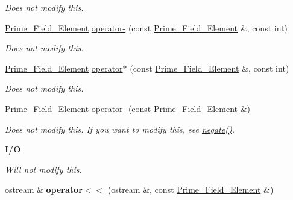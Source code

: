 \begin{Indent}
\begin{DoxyCompactItemize}
\begin{DoxyCompactList}\small\item\em Does not modify {\ttfamily this}. \end{DoxyCompactList}\item 
\mbox{\label{group___fields_group_accac0f77357d7389ac1fc8613be39d72}} 
\hyperlink{group___fields_group_class_prime___field___element}{Prime\+\_\+\+Field\+\_\+\+Element} \hyperlink{group___fields_group_accac0f77357d7389ac1fc8613be39d72}{operator-\/} (const \hyperlink{group___fields_group_class_prime___field___element}{Prime\+\_\+\+Field\+\_\+\+Element} \&, const int)
\begin{DoxyCompactList}\small\item\em Does not modify {\ttfamily this}. \end{DoxyCompactList}\item 
\mbox{\label{group___fields_group_a71eef3b2216feb8fdb024cf603b7663a}} 
\hyperlink{group___fields_group_class_prime___field___element}{Prime\+\_\+\+Field\+\_\+\+Element} \hyperlink{group___fields_group_a71eef3b2216feb8fdb024cf603b7663a}{operator$\ast$} (const \hyperlink{group___fields_group_class_prime___field___element}{Prime\+\_\+\+Field\+\_\+\+Element} \&, const int)
\begin{DoxyCompactList}\small\item\em Does not modify {\ttfamily this}. \end{DoxyCompactList}\item 
\mbox{\label{group___fields_group_ad1438eeaa8a2c75ca905dac604f8cebd}} 
\hyperlink{group___fields_group_class_prime___field___element}{Prime\+\_\+\+Field\+\_\+\+Element} \hyperlink{group___fields_group_ad1438eeaa8a2c75ca905dac604f8cebd}{operator-\/} (const \hyperlink{group___fields_group_class_prime___field___element}{Prime\+\_\+\+Field\+\_\+\+Element} \&)
\begin{DoxyCompactList}\small\item\em Does not modify {\ttfamily this}. If you want to modify {\ttfamily this}, see \hyperlink{group___fields_group_ab64fb1e850fb81bcf03345e11f5b6fb7}{negate()}. \end{DoxyCompactList}\end{DoxyCompactItemize}
\end{Indent}
\begin{Indent}\textbf{ I/O}\par
{\em Will not modify {\ttfamily this}. }\begin{DoxyCompactItemize}
\item 
\mbox{\label{group___fields_group_a7b56125cbfdccee3e56a80ed7987d2cc}} 
ostream \& {\bfseries operator$<$$<$} (ostream \&, const \hyperlink{group___fields_group_class_prime___field___element}{Prime\+\_\+\+Field\+\_\+\+Element} \&)
\end{DoxyCompactItemize}
\end{Indent}


